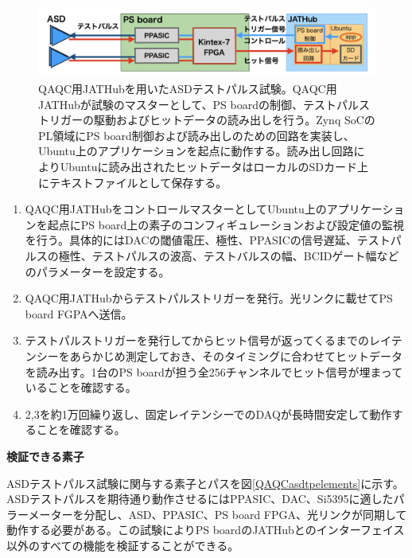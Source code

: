 \begin{figure} 
\centering
\includegraphics[width=16cm]{fig/QAQC/QAQCasdtp.png}
\caption[QAQC用JATHubを用いたASDテストパルス試験]{QAQC用JATHubを用いたASDテストパルス試験。QAQC用JATHubが試験のマスターとして、PS boardの制御、テストパルストリガーの駆動およびヒットデータの読み出しを行う。Zynq SoCのPL領域にPS board制御および読み出しのための回路を実装し、Ubuntu上のアプリケーションを起点に動作する。読み出し回路によりUbuntuに読み出されたヒットデータはローカルのSDカード上にテキストファイルとして保存する。}
\label{QAQCasdtp}
\end{figure}

\begin{enumerate}
    \item QAQC用JATHubをコントロールマスターとしてUbuntu上のアプリケーションを起点にPS board上の素子のコンフィギュレーションおよび設定値の監視を行う。具体的にはDACの閾値電圧、極性、PPASICの信号遅延、テストパルスの極性、テストパルスの波高、テストバルスの幅、BCIDゲート幅などのパラメーターを設定する。
    \baselineskip

    \item QAQC用JATHubからテストパルストリガーを発行。光リンクに載せてPS board FGPAへ送信。
    \baselineskip

    \item テストパルストリガーを発行してからヒット信号が返ってくるまでのレイテンシーをあらかじめ測定しておき、そのタイミングに合わせてヒットデータを読み出す。1台のPS boardが担う全256チャンネルでヒット信号が埋まっていることを確認する。
    \baselineskip

    \item 2,3を約1万回繰り返し、固定レイテンシーでのDAQが長時間安定して動作することを確認する。
\end{enumerate}

\textbf{検証できる素子}\par
ASDテストパルス試験に関与する素子とパスを図\ref{QAQCasdtpelements}に示す。ASDテストパルスを期待通り動作させるにはPPASIC、DAC、Si5395に適したパラーメーターを分配し、ASD、PPASIC、PS board FPGA、光リンクが同期して動作する必要がある。この試験によりPS boardのJATHubとのインターフェイス以外のすべての機能を検証することができる。
\baselineskip

